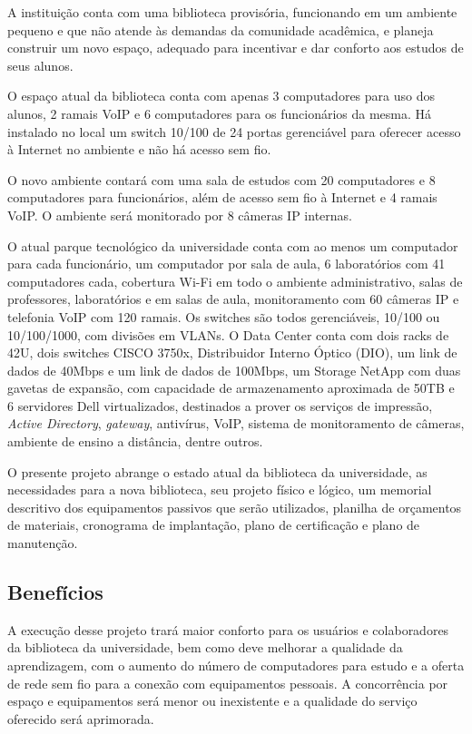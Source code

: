 \documentclass[	DIV=calc,%
							paper=a4,%
							fontsize=12pt,%
							onecolumn]{scrartcl}	 					%
\begin{document}
A instituição conta com uma biblioteca provisória, funcionando em um ambiente pequeno e que não atende às demandas da comunidade acadêmica, e planeja construir um novo espaço, adequado para incentivar e dar conforto aos estudos de seus alunos.

O espaço atual da biblioteca conta com apenas 3 computadores para uso dos alunos, 2 ramais VoIP e 6 computadores para os funcionários da mesma. Há instalado no local um switch 10/100 de 24 portas gerenciável para oferecer acesso à Internet no ambiente e não há acesso sem fio.

O novo ambiente contará com uma sala de estudos com 20 computadores e 8 computadores para funcionários, além de acesso sem fio à Internet e 4 ramais VoIP. O ambiente será monitorado por 8 câmeras IP internas.

O atual parque tecnológico da universidade conta com ao menos um computador para cada funcionário, um computador por sala de aula, 6 laboratórios com 41 computadores cada, cobertura Wi-Fi em todo o ambiente administrativo, salas de professores, laboratórios e em salas de aula, monitoramento com 60 câmeras IP e telefonia VoIP com 120 ramais. Os switches são todos gerenciáveis, 10/100 ou 10/100/1000, com divisões em VLANs. O Data Center conta com dois racks de 42U, dois switches CISCO 3750x, Distribuidor Interno Óptico (DIO), um link de dados de 40Mbps e um link de dados de 100Mbps, um Storage NetApp com duas gavetas de expansão, com capacidade de armazenamento aproximada de 50TB e 6 servidores Dell virtualizados, destinados a prover os serviços de impressão, \textit{Active Directory}, \textit{gateway}, antivírus, VoIP, sistema de monitoramento de câmeras, ambiente de ensino a distância, dentre outros.

O presente projeto abrange o estado atual da biblioteca da universidade, as necessidades para a nova biblioteca, seu projeto físico e lógico, um memorial descritivo dos equipamentos passivos que serão utilizados, planilha de orçamentos de materiais, cronograma de implantação, plano de certificação e plano de manutenção.

\subsection{Benefícios}
A execução desse projeto trará maior conforto para os usuários e colaboradores da biblioteca da universidade, bem como deve melhorar a qualidade da aprendizagem, com o aumento do número de computadores para estudo e a oferta de rede sem fio para a conexão com equipamentos pessoais. A concorrência por espaço e equipamentos será menor ou inexistente e a qualidade do serviço oferecido será aprimorada.
\end{document}
